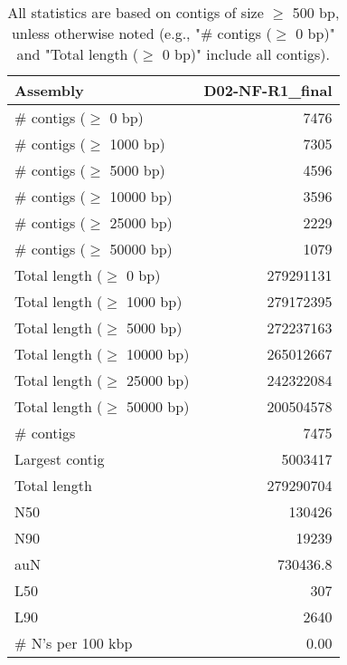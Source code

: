 \documentclass[12pt,a4paper]{article}
\begin{document}
\begin{table}[ht]
\begin{center}
\caption{All statistics are based on contigs of size $\geq$ 500 bp, unless otherwise noted (e.g., "\# contigs ($\geq$ 0 bp)" and "Total length ($\geq$ 0 bp)" include all contigs).}
\begin{tabular}{|l*{1}{|r}|}
\hline
Assembly & D02-NF-R1\_final \\ \hline
\# contigs ($\geq$ 0 bp) & 7476 \\ \hline
\# contigs ($\geq$ 1000 bp) & 7305 \\ \hline
\# contigs ($\geq$ 5000 bp) & 4596 \\ \hline
\# contigs ($\geq$ 10000 bp) & 3596 \\ \hline
\# contigs ($\geq$ 25000 bp) & 2229 \\ \hline
\# contigs ($\geq$ 50000 bp) & 1079 \\ \hline
Total length ($\geq$ 0 bp) & 279291131 \\ \hline
Total length ($\geq$ 1000 bp) & 279172395 \\ \hline
Total length ($\geq$ 5000 bp) & 272237163 \\ \hline
Total length ($\geq$ 10000 bp) & 265012667 \\ \hline
Total length ($\geq$ 25000 bp) & 242322084 \\ \hline
Total length ($\geq$ 50000 bp) & 200504578 \\ \hline
\# contigs & 7475 \\ \hline
Largest contig & 5003417 \\ \hline
Total length & 279290704 \\ \hline
N50 & 130426 \\ \hline
N90 & 19239 \\ \hline
auN & 730436.8 \\ \hline
L50 & 307 \\ \hline
L90 & 2640 \\ \hline
\# N's per 100 kbp & 0.00 \\ \hline
\end{tabular}
\end{center}
\end{table}
\end{document}
